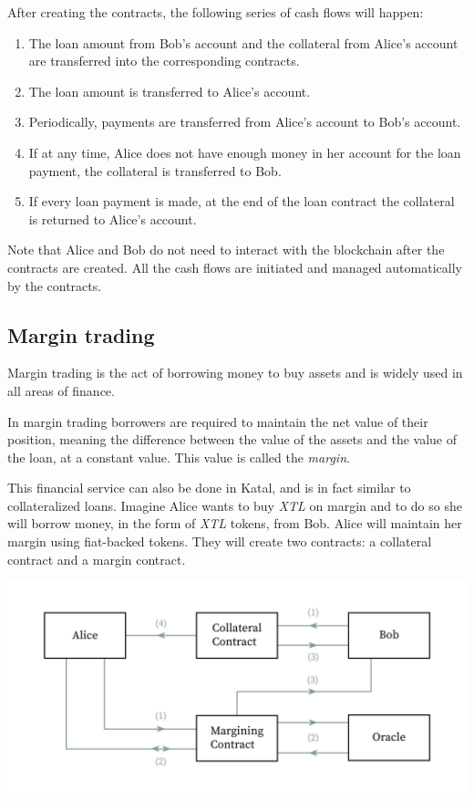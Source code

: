 \documentclass[conference]{IEEEtran}
\begin{document}
After creating the contracts, the following series of cash flows will happen:

\begin{enumerate}
	\item The loan amount from Bob's account and the collateral from Alice's account are transferred into the corresponding contracts.
	\item The loan amount is transferred to Alice's account.
	\item Periodically, payments are transferred from Alice's account to Bob's account.
	\item If at any time, Alice does not have enough money in her account for the loan payment, the collateral is transferred to Bob.
	\item If every loan payment is made, at the end of the loan contract the collateral is returned to Alice's account.
\end{enumerate}

Note that Alice and Bob do not need to interact with the blockchain after the contracts are created. All the cash flows are initiated and managed automatically by the contracts.

\subsection{Margin trading}
Margin trading is the act of borrowing money to buy assets and is widely used in all areas of finance.

In margin trading borrowers are required to maintain the net value of their position, meaning the difference between the value of the assets and the value of the loan, at a constant value. This value is called the \textit{margin}.

This financial service can also be done in Katal, and is in fact similar to collateralized loans. Imagine Alice wants to buy \textit{XTL} on margin and to do so she will borrow money, in the form of \textit{XTL} tokens, from Bob. Alice will maintain her margin using fiat-backed tokens. They will create two contracts: a collateral contract and a margin contract.

\includegraphics[width=\linewidth]{images/margin_trading.jpg}
\end{document}
